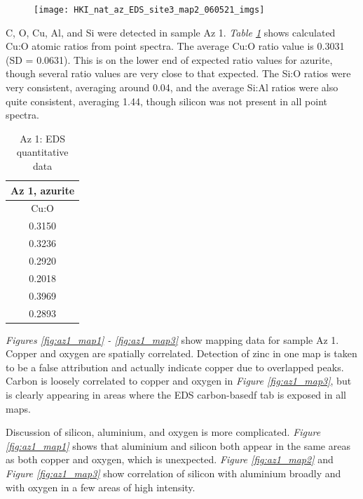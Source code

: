 \begin{figure}[H]
\centering
  \texttt{[image: HKI\_nat\_az\_EDS\_site3\_map2\_060521\_imgs]}
\label{fig:hki_map2}
\end{figure}


C, O, Cu, Al, and Si were detected in sample Az 1. \textit{Table \ref{table:az1_ratios}} shows calculated Cu:O atomic ratios from point spectra. The average Cu:O ratio value is 0.3031 (SD = 0.0631). This is on the lower end of expected ratio values for azurite, though several ratio values are very close to that expected. The Si:O ratios were very consistent, averaging around 0.04, and the average Si:Al ratios were also quite consistent, averaging 1.44, though silicon was not present in all point spectra.

\begin{table}[H]
\caption{Az 1: EDS quantitative data}
\centering
\label{table:az1_ratios}
\begin{tabular}{c}
\toprule
Az 1, azurite \\
\midrule
Cu:O \\
\midrule
0.3150 \\
0.3236 \\
0.2920 \\
0.2018 \\
0.3969 \\
0.2893 \\
\bottomrule
\end{tabular}
\end{table}

\textit{Figures \ref{fig:az1_map1} - \ref{fig:az1_map3}} show mapping data for sample Az 1. Copper and oxygen are spatially correlated. Detection of zinc in one map is taken to be a false attribution and actually indicate copper due to overlapped peaks. Carbon is loosely correlated to copper and oxygen in \textit{Figure \ref{fig:az1_map3}}, but is clearly appearing in areas where the EDS carbon-basedf tab is exposed in all maps.

Discussion of silicon, aluminium, and oxygen is more complicated. \textit{Figure \ref{fig:az1_map1}} shows that aluminium and silicon both appear in the same areas as both copper and oxygen, which is unexpected. \textit{Figure \ref{fig:az1_map2}} and \textit{Figure \ref{fig:az1_map3}} show correlation of silicon with aluminium broadly and with oxygen in a few areas of high intensity.

